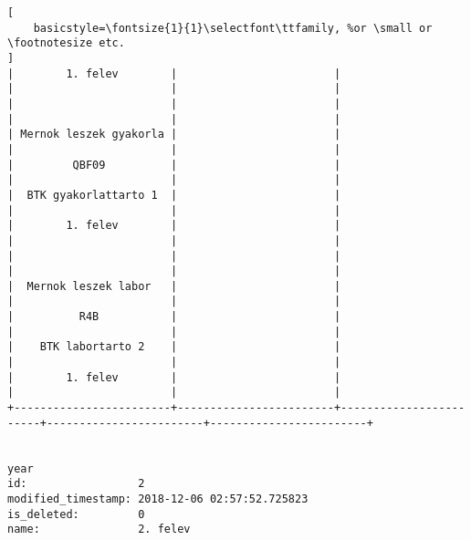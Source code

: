 \begin{lstlisting}[
    basicstyle=\fontsize{1}{1}\selectfont\ttfamily, %or \small or \footnotesize etc.
]
|        1. felev        |                        |                        |                        |                        | 
|                        |                        |                        |                        |                        | 
| Mernok leszek gyakorla |                        |                        |                        |                        | 
|         QBF09          |                        |                        |                        |                        | 
|  BTK gyakorlattarto 1  |                        |                        |                        |                        | 
|        1. felev        |                        |                        |                        |                        | 
|                        |                        |                        |                        |                        | 
|  Mernok leszek labor   |                        |                        |                        |                        | 
|          R4B           |                        |                        |                        |                        | 
|    BTK labortarto 2    |                        |                        |                        |                        | 
|        1. felev        |                        |                        |                        |                        | 
+------------------------+------------------------+------------------------+------------------------+------------------------+


year                
id:                 2
modified_timestamp: 2018-12-06 02:57:52.725823
is_deleted:         0
name:               2. felev


\end{lstlisting}

